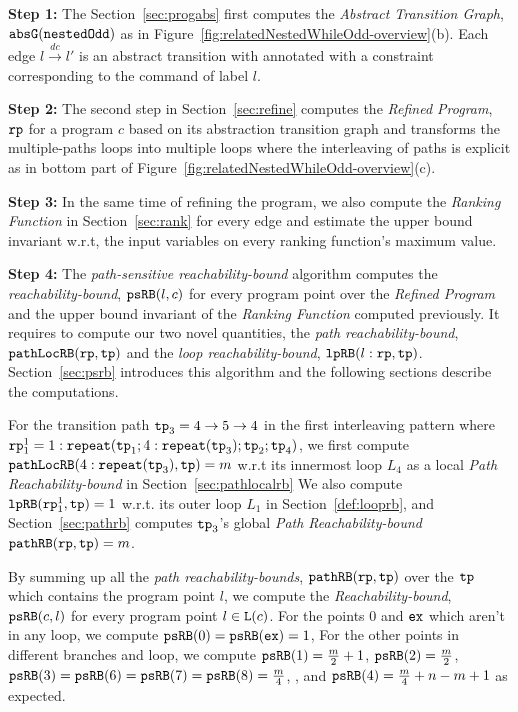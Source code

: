 \textbf{Step 1: }
The Section~\ref{sec:progabs} first 
computes the \emph{Abstract Transition Graph}, $\mathtt{abs}{\mathtt{G}}(\mathtt{nestedOdd})$ as in Figure~\ref{fig:relatedNestedWhileOdd-overview}(b).
Each edge $l \xrightarrow{dc} l'$ is an abstract transition with annotated with a constraint corresponding to the command of label $l$.

\textbf{Step 2: }
The second step in Section~\ref{sec:refine}
computes the \emph{Refined Program}, $\mathtt{rp}$ for a program $c$ based on 
its abstraction transition graph and transforms the multiple-paths loops
into multiple loops where
the interleaving of paths is explicit as in bottom part of Figure~\ref{fig:relatedNestedWhileOdd-overview}(c).

\textbf{Step 3: }
In the same time of refining the program, we also compute the \emph{Ranking Function} in Section~\ref{sec:rank}
for every edge 
and estimate the upper bound invariant w.r.t, the input variables on every ranking function's maximum value.

\textbf{Step 4: }
The \emph{path-sensitive reachability-bound} algorithm computes the \emph{reachability-bound}, $\mathtt{psRB}(l, c)$ for every program point over the \emph{Refined Program} and the upper bound invariant of the \emph{Ranking Function} computed previously.
It requires to compute our two novel quantities, the \emph{path reachability-bound}, $\mathtt{pathLocRB}(\mathtt{rp}, \mathtt{tp})$ and the \emph{loop reachability-bound}, $\mathtt{lpRB}(l: \mathtt{rp}, \mathtt{tp})$.
Section~\ref{sec:psrb} introduces this algorithm and the following sections describe the computations. 

For the transition path $\mathtt{tp}_3 = 4 \to 5 \to 4$ in the first interleaving pattern where $\mathtt{rp}_1^1 = 1: \mathtt{repeat}(\mathtt{tp}_1; 4:\mathtt{repeat}(\mathtt{tp}_3); \mathtt{tp}_2; \mathtt{tp}_4)$,
we first compute $\mathtt{pathLocRB}(4:\mathtt{repeat}(\mathtt{tp}_3), \mathtt{tp}) = m$ w.r.t its innermost loop $L_4$ as a local \emph{Path Reachability-bound} in Section~\ref{sec:pathlocalrb}
We also compute $\mathtt{lpRB}(\mathtt{rp}_1^1, \mathtt{tp}) = 1$ w.r.t. its outer loop $L_1$ in Section~\ref{def:looprb},
and Section~\ref{sec:pathrb} computes $\mathtt{tp}_3$'s global \emph{Path Reachability-bound} $\mathtt{pathRB}(\mathtt{rp}, \mathtt{tp}) = m$.

By summing up all the \emph{path reachability-bounds}, $\mathtt{pathRB}(\mathtt{rp}, \mathtt{tp})$ over the $\mathtt{tp}$ which contains the program point $l$, we compute the \emph{Reachability-bound}, $\mathtt{psRB}(c, l)$ for every program point $l \in \mathtt{L}(c)$.
For the points $0$ and $\mathtt{ex}$ which aren't in any loop, we compute $\mathtt{psRB}(0) = \mathtt{psRB}(\mathtt{ex}) = 1$,
For the other points in different branches and loop, we compute $\mathtt{psRB}(1) = \frac{m}{2} + 1$,
$\mathtt{psRB}(2) = \frac{m}{2} $, 
$\mathtt{psRB}(3) = \mathtt{psRB}(6) = \mathtt{psRB}(7)  = \mathtt{psRB}(8) = \frac{m}{4} $,
,
and $\mathtt{psRB}(4) =  \frac{m}{4} + n - m + 1$ as expected.


